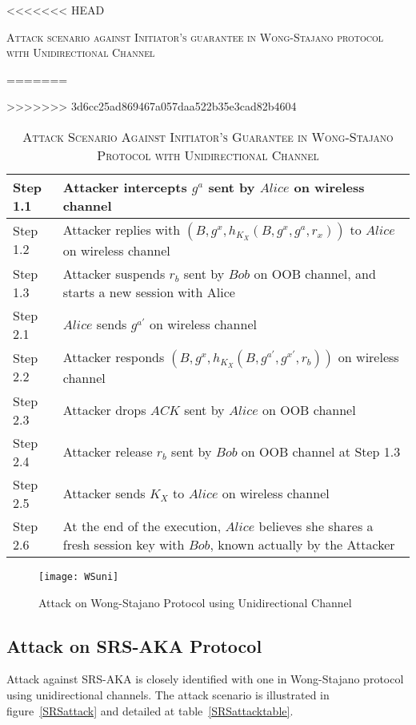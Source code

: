 \begin{enumerate}
\begin{enumerate}
\begin{table}[t]
\centering
<<<<<<< HEAD
\caption{\textsc{Attack scenario against Initiator's guarantee in Wong-Stajano protocol with Unidirectional Channel}}
=======
\caption{\textsc{Attack Scenario Against Initiator's Guarantee in Wong-Stajano Protocol with Unidirectional Channel}}
>>>>>>> 3d6cc25ad869467a057daa522b35e3cad82b4604
\label{WSuniattack}
{\small
\begin{tabular}{| l | p{11cm} |}
 \hline
 Step 1.1 & Attacker intercepts $g^{a}$ sent by $Alice$ on wireless channel\\ \hline
 Step 1.2 & Attacker replies with $(B, g^{x}, h_{K_X}(B,g^{x},g^a,r_x))$ to $Alice$ on wireless channel\\ \hline
 Step 1.3 & Attacker suspends $r_b$ sent by $Bob$ on OOB channel, and starts a new session with Alice\\ \hline \hline
 Step 2.1 & $Alice$ sends $g^{a'}$ on wireless channel\\ \hline
 Step 2.2 & Attacker responds $(B, g^{x}, h_{K_X}(B,g^{a'},g^{x'},r_b))$ on wireless channel\\ \hline
 Step 2.3 & Attacker drops $ACK$ sent by $Alice$ on OOB channel\\ \hline
 Step 2.4 & Attacker release $r_b$ sent by $Bob$ on OOB channel at Step 1.3\\ \hline
 Step 2.5 & Attacker sends $K_X$ to $Alice$ on wireless channel\\ \hline
 Step 2.6 & At the end of the execution, $Alice$ believes she shares a fresh session key with $Bob$, known actually by the Attacker\\ \hline
\end{tabular}
}
\end{table}

\begin{figure}
  \centering
  \texttt{[image: WSuni]}
  \caption{Attack on Wong-Stajano Protocol using Unidirectional Channel}
  \label{WSuniattack}
\end{figure}

\subsection{Attack on SRS-AKA Protocol}

Attack against SRS-AKA is closely identified with one in Wong-Stajano protocol using unidirectional channels. The attack scenario is illustrated in figure~\ref{SRSattack} and detailed at table~\ref{SRSattacktable}.


\end{enumerate}
\end{enumerate}
